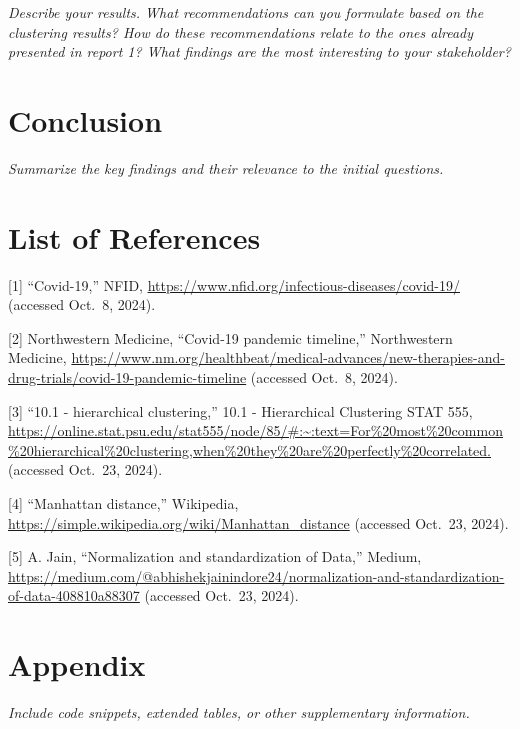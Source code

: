 \documentclass[
]{article}
\begin{document}
\emph{Describe your results. What recommendations can you formulate
based on the clustering results? How do these recommendations relate to
the ones already presented in report 1? What findings are the most
interesting to your stakeholder?}

\newpage

\section{Conclusion}\label{conclusion}

\emph{Summarize the key findings and their relevance to the initial
questions.}

\newpage

\section{List of References}\label{list-of-references}

{[}1{]} ``Covid-19,'' NFID,
\url{https://www.nfid.org/infectious-diseases/covid-19/} (accessed
Oct.~8, 2024).

{[}2{]} Northwestern Medicine, ``Covid-19 pandemic timeline,''
Northwestern Medicine,
\url{https://www.nm.org/healthbeat/medical-advances/new-therapies-and-drug-trials/covid-19-pandemic-timeline}
(accessed Oct.~8, 2024).

{[}3{]} ``10.1 - hierarchical clustering,'' 10.1 - Hierarchical
Clustering \textbar{} STAT 555,
\url{https://online.stat.psu.edu/stat555/node/85/\#:~:text=For\%20most\%20common\%20hierarchical\%20clustering,when\%20they\%20are\%20perfectly\%20correlated.}
(accessed Oct.~23, 2024).

{[}4{]} ``Manhattan distance,'' Wikipedia,
\url{https://simple.wikipedia.org/wiki/Manhattan_distance} (accessed
Oct.~23, 2024).

{[}5{]} A. Jain, ``Normalization and standardization of Data,''
Medium,\\
\href{https://medium.com/@abhishekjainindore24/normalization-and-standardization-of-data-408810a88307}{https://medium.com/@abhishekjainindore24/normalization-and-standardization-of-data-408810a88307}
(accessed Oct.~23, 2024).

\newpage

\section{Appendix}\label{appendix}

\emph{Include code snippets, extended tables, or other supplementary
information.}
\end{document}
